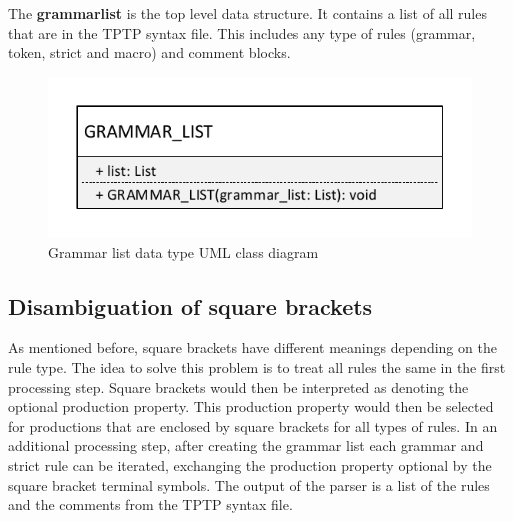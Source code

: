 The \textbf{grammar\textunderscore list} is the top level data structure. It contains a list of all rules that are in the TPTP syntax file.
This includes any type of rules (grammar, token, strict and macro) and comment blocks. 

\begin{figure}[H]
\centering
\includegraphics[width=.5\textwidth]{images/Concept_uml_data_types_grammar_list.pdf}
\caption{Grammar list data type UML class diagram}
\label{fig:ConceptGrammarListClassDiagram}
\end{figure}

\subsection{Disambiguation of  square brackets}\label{sec:ConceptDisambiguation}
As mentioned before, square brackets have different meanings depending on the rule type.
The idea to solve this problem is to treat all rules the same in the first processing step.
Square brackets would then be interpreted as denoting the optional production property.
This production property would then be selected for productions that are enclosed by square brackets for all types of rules.
In an additional processing step, after creating the grammar list each grammar and strict rule can be iterated, exchanging the production property optional by the square bracket terminal symbols.
The output of the parser is a list of the rules and the comments from the \ac{TPTP} syntax file.

